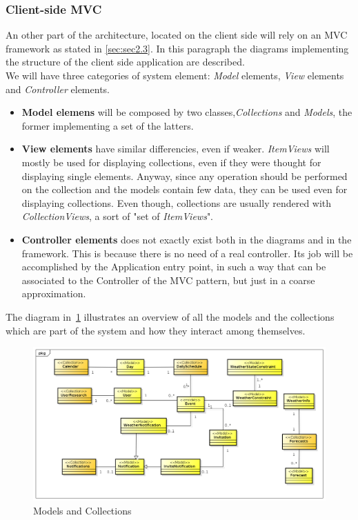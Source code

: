   
\subsubsection{Client-side MVC}
An other part of the architecture, located on the client side will rely on an MVC framework as stated in \autoref{sec:sec2.3}.
In this paragraph the diagrams implementing the structure of the client side application are described.\\
We will have three categories of system element: \textit{Model} elements, \textit{View} elements and \textit{Controller} elements.
\begin{itemize}
\item \textbf{Model elemens} will be composed by two classes,\textit{Collections} and \textit{Models}, the former implementing a set of the latters.
\item \textbf{View elements} have similar differencies, even if weaker. \textit{ItemViews} will mostly be used for displaying collections, even if they were thought for displaying single elements. Anyway, since any operation should be performed on the collection and the models contain few data, they can be used even for displaying collections. Even though, collections are usually rendered with \textit{CollectionViews}, a sort of "set of \textit{ItemViews}".
\item \textbf{Controller elements} does not exactly exist both in the diagrams and in the framework. This is because there is no need of a real controller. Its job will be accomplished by the Application entry point, in such a way that can be associated to the Controller of the MVC pattern, but just in a coarse approximation.
\end{itemize}
The diagram in~\ref{fig:modelovervie} illustrates an overview of all the models and the collections which are part of the system and how they interact among themselves.
 \begin{center}
 \begin{figure}[H]
    \includegraphics[width=1\textwidth]{../MVCDiagram/MVCBackbone/AllModelsAndCollections.png}
    \caption{Models and Collections}
     \label{fig:modelovervie}
     \end{figure}
   \end{center}  


